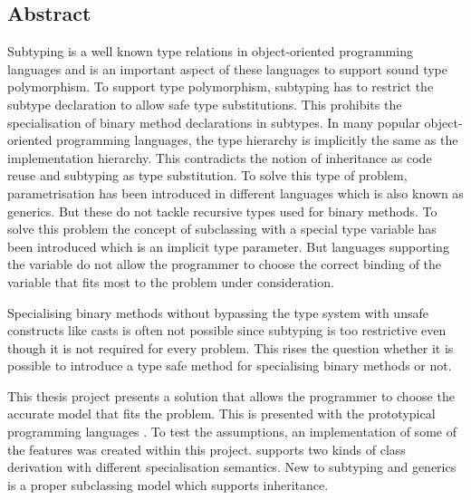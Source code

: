 %
%
\subsection*{Abstract}
Subtyping is a well known type relations in object-oriented
programming languages and is an important aspect of these languages
to support sound type polymorphism. To support type polymorphism,
subtyping has to restrict the subtype declaration to allow safe type
substitutions. This prohibits the specialisation of binary method declarations 
in subtypes. In many popular object-oriented programming languages, the type
hierarchy is implicitly the same as the implementation hierarchy. This
contradicts the notion of inheritance as code reuse and subtyping as type
substitution. To solve this type of problem, parametrisation has been introduced in
different languages which is also known as generics. But these do not
tackle recursive types used for binary methods. To solve this problem
the concept of subclassing with a special type variable \mytype has been
introduced which is an implicit type parameter. But languages supporting
the \mytype variable do not allow the programmer to choose the correct
binding of the variable that fits most to the problem under consideration.

Specialising binary methods without bypassing the type system with
unsafe constructs like casts is often not possible since subtyping is
too restrictive even though it is not required for every problem. This
rises the question whether it is possible to introduce a type safe method
for specialising binary methods or not.

This thesis project presents a solution that allows the programmer to
choose the accurate model that fits the problem. This is presented
with the prototypical programming languages \ooplss. To test the
assumptions, an implementation of some of the features was created
within this project. \ooplss supports two kinds of class derivation
with different specialisation semantics. New to subtyping and generics
is a proper subclassing model which supports inheritance.

